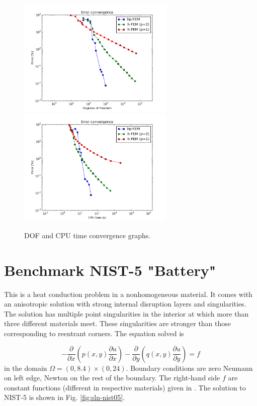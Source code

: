 \documentclass[12pt]{elsarticle}
\begin{document}
\begin{figure}[H]
\centering
\hspace{-50mm}
\includegraphics[width=7.5cm]{nist/nist-4/conv_dof_aniso.png}\ \
\hspace{-10mm}
\includegraphics[width=7.5cm]{nist/nist-4/conv_cpu_aniso.png}
\hspace{-50mm}
\caption{DOF and CPU time convergence graphs.}
\label{fig:nist-4-conv}
\end{figure}


\section{Benchmark NIST-5 "Battery"}
\label{sec:bench-5}

This is a heat conduction problem in a nonhomogeneous material.
It comes with an anisotropic solution with strong internal disruption
layers and singularities.
The solution has multiple point singularities in the interior at which
more than three different materials meet. These singularities are stronger than those
corresponding to reentrant corners. The equation solved is

\begin{equation} \label{heat-conduction}
-\frac{\partial }{\partial x}\left(p(x, y)\frac{\partial u}{\partial x}\right)
-\frac{\partial }{\partial y}\left(q(x, y)\frac{\partial u}{\partial y}\right) = f
\end{equation}
in the domain $\Omega = (0, 8.4) \times (0, 24)$. Boundary conditions are zero Neumann on left edge, Newton on the rest of the boundary.
The right-hand side $f$ are constant functions (different in respective materials) given in \cite{mitchell-1}.
The solution to NIST-5 is shown in Fig. \ref{fig:sln-nist05}.
\end{document}
